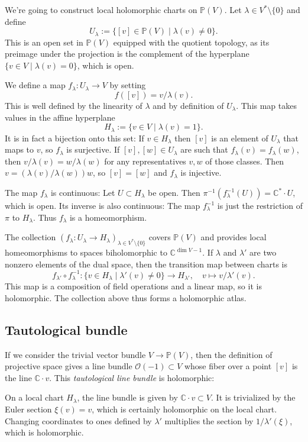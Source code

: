 \documentclass[10pt,a4paper]{article}
\newcommand{\kk}[1]{\mathbb{#1}}
\newcommand{\cc}[1]{\mathcal{#1}}
\begin{document}
We're going to construct local holomorphic charts on $\kk P(V)$. Let $\lambda \in V^* \setminus \{0\}$ and define
$$
U_\lambda := \{ [v] \in \kk P(V) \mid \lambda(v) \not= 0 \}.
$$
This is an open set in $\kk P(V)$ equipped with the quotient topology, as its preimage under the projection is the complement of the hyperplane $\{v \in V \mid \lambda(v) = 0\}$, which is open.

We define a map $f_\lambda: U_\lambda \to V$ by setting
$$
f([v]) = v/\lambda(v).
$$
This is well defined by the linearity of $\lambda$ and by definition of $U_\lambda$. This map takes values in the affine hyperplane
$$
H_\lambda := \{ v \in V \mid \lambda(v) = 1 \}.
$$
It is in fact a bijection onto this set: If $v \in H_\lambda$ then $[v]$ is an element of $U_\lambda$ that maps to $v$, so $f_\lambda$ is surjective. If $[v], [w] \in U_\lambda$ are such that $f_\lambda(v) = f_\lambda(w)$, then $v/\lambda(v) = w/\lambda(w)$ for any representatives $v, w$ of those classes. Then $v = (\lambda(v)/\lambda(w)) w$, so $[v] = [w]$ and $f_\lambda$ is injective.

The map $f_\lambda$ is continuous: Let $U \subset H_\lambda$ be open. Then $\pi^{-1}(f_\lambda^{-1}(U)) = \kk C^* \cdot U$, which is open. Its inverse is also continuous: The map $f_\lambda^{-1}$ is just the restriction of $\pi$ to $H_\lambda$. Thus $f_\lambda$ is a homeomorphism.

The collection $(f_\lambda : U_\lambda \to H_\lambda)_{\lambda \in V^* \setminus \{0\}}$ covers $\kk P(V)$ and provides local homeomorphisms to spaces biholomorphic to $\kk C^{\dim V - 1}$. If $\lambda$ and $\lambda'$ are two nonzero elements of the dual space, then the transition map between charts is
$$
f_{\lambda'} \circ f_{\lambda}^{-1} : \{v \in H_\lambda \mid \lambda'(v) \not= 0 \} \to H_{\lambda'},
\quad
v \mapsto v/\lambda'(v).
$$
This map is a composition of field operations and a linear map, so it is holomorphic. The collection above thus forms a holomorphic atlas.


\subsection{Tautological bundle}


If we consider the trivial vector bundle $V \to \kk P(V)$, then the definition of projective space gives a line bundle $\cc O(-1) \subset V$ whose fiber over a point $[v]$ is
the line $\kk C \cdot v$. This \emph{tautological line bundle} is holomorphic:

On a local chart $H_\lambda$, the line bundle is given by $\kk C \cdot v \subset V$. It is trivialized by the Euler section $\xi(v) = v$, which is certainly holomorphic on the local chart. Changing coordinates to ones defined by $\lambda'$ multiplies the section by $1/\lambda'(\xi)$, which is holomorphic.
\end{document}
